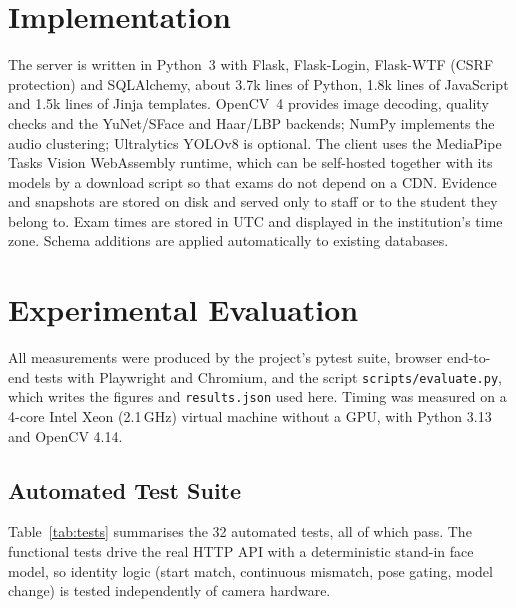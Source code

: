 \documentclass[conference]{IEEEtran}
\begin{document}
\section{Implementation}
The server is written in Python~3 with Flask, Flask-Login, Flask-WTF (CSRF protection) and SQLAlchemy, about 3.7k lines of Python, 1.8k lines of JavaScript and 1.5k lines of Jinja templates. OpenCV~4 provides image decoding, quality checks and the YuNet/SFace and Haar/LBP backends; NumPy implements the audio clustering; Ultralytics YOLOv8 is optional. The client uses the MediaPipe Tasks Vision WebAssembly runtime, which can be self-hosted together with its models by a download script so that exams do not depend on a CDN. Evidence and snapshots are stored on disk and served only to staff or to the student they belong to. Exam times are stored in UTC and displayed in the institution's time zone. Schema additions are applied automatically to existing databases.

\section{Experimental Evaluation}
All measurements were produced by the project's pytest suite, browser end-to-end tests with Playwright and Chromium, and the script \texttt{scripts/evaluate.py}, which writes the figures and \texttt{results.json} used here. Timing was measured on a 4-core Intel Xeon (2.1\,GHz) virtual machine without a GPU, with Python 3.13 and OpenCV 4.14.

\subsection{Automated Test Suite}
Table~\ref{tab:tests} summarises the 32 automated tests, all of which pass. The functional tests drive the real HTTP API with a deterministic stand-in face model, so identity logic (start match, continuous mismatch, pose gating, model change) is tested independently of camera hardware.
\end{document}
